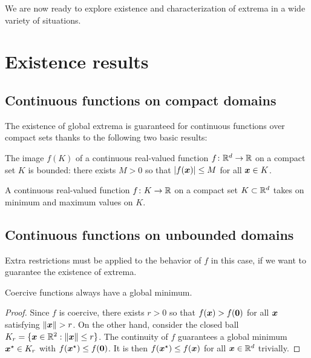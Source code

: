 We are now ready to explore existence and characterization of extrema in a wide variety of situations.

\section{Existence results}
\subsection{Continuous functions on compact domains}
The existence of global extrema is guaranteed for continuous functions over compact sets thanks to the following two basic results:

\begin{theorem}\label{theorem:BVT}
The image $f(K)$ of a continuous real-valued function $f \colon \mathbb{R}^d \to \mathbb{R}$ on a compact set $K$ is bounded: there exists $M>0$ so that $\lvert  f(\boldsymbol{x})  \rvert \leq M$ for all $\boldsymbol{x} \in K$.
\end{theorem}

\begin{theorem}\label{theorem:EVT}
A continuous real-valued function $f \colon K \to \mathbb{R}$ on a compact set $K \subset \mathbb{R}^d$ takes on minimum and maximum values on $K$.
\end{theorem}

\subsection{Continuous functions on unbounded domains}
Extra restrictions must be applied to the behavior of $f$ in this case, if we want to guarantee the existence of extrema. 

\begin{theorem}\label{theorem:CoerciveFunctions}
Coercive functions always have a global minimum.
\end{theorem}
\begin{proof}
Since $f$ is coercive, there exists $r>0$ so that $f(\boldsymbol{x}) > f(\boldsymbol{0})$ for all $\boldsymbol{x}$ satisfying $\lVert \boldsymbol{x} \rVert>r$.  On the other hand, consider the closed ball $K_r = \{ \boldsymbol{x} \in \mathbb{R}^2 : \lVert \boldsymbol{x} \rVert \leq r \}$.  The continuity of $f$ guarantees a global minimum $\boldsymbol{x}^{\star} \in K_r$ with $f(\boldsymbol{x}^{\star}) \leq f(\boldsymbol{0})$.  It is then $f(\boldsymbol{x}^{\star}) \leq f(\boldsymbol{x})$ for all $\boldsymbol{x} \in \mathbb{R}^d$ trivially.
\end{proof}

